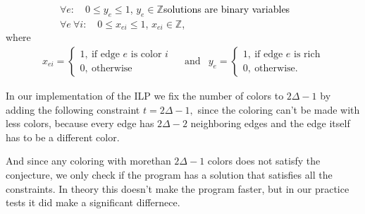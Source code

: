 \documentclass[12pt,a4paper]{amsart}
\theoremstyle{definition} %
\theoremstyle{plain} %
\newcommand{\Z}{\mathbb Z}
\begin{document}
        \ \ \ \ \ \ \ \ \ \ \ $\forall e: \quad 0 \leq y_{e} \leq 1$, $y_{e} \in \Z$\hfill \normalsize{\textcolor{black}{solutions are binary variables}}\\

        \ \ \ \ \ \ \ \ \ \ \ $\forall e \ \forall i: \quad 0 \leq x_{ei} \leq 1$, $x_{ei} \in \Z$,\\

        where
        \begin{align*} x_{ei} = 
            \begin{cases}
                1, \  \text{if edge $e$ is color $i$} \\
                0, \  \text{otherwise}
            \end{cases} \ \ & \text{and} & 
                y_{e} = 
            \begin{cases}
                1, \  \text{if edge $e$ is rich} \\
                0, \  \text{otherwise.}
            \end{cases}
        \end{align*}

        In our implementation of the ILP we fix the number of colors to $2 \Delta - 1$ by adding the following constraint $t = 2\Delta - 1,$ since the coloring can't be made with less colors, because every edge has $2 \Delta - 2$ neighboring edges and the edge itself has to be a different color. 
        
        \begin{center}
        \end{center}

        
        And since any coloring with morethan $2\Delta - 1$ colors does not satisfy the conjecture, we only check if the program has a solution that satisfies all the constraints. In theory this doesn't make the program faster, but in our practice tests it did make a significant differnece.\\
\end{document}
